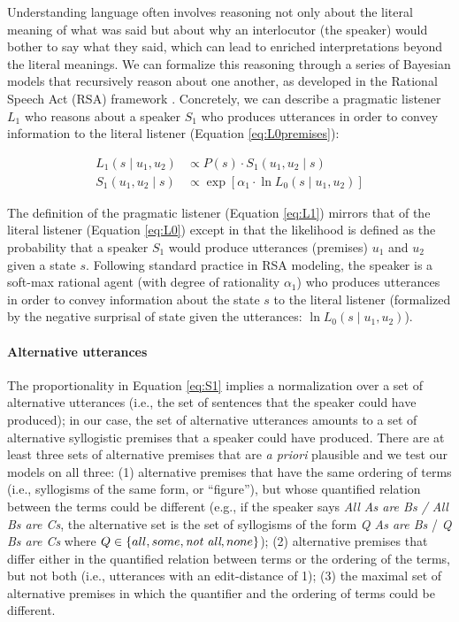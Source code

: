 \documentclass[floatsintext, doc]{apa6}
\begin{document}
Understanding language often involves reasoning not only about the literal meaning of what was said but about why an interlocutor (the speaker) would bother to say what they said, which can lead to enriched interpretations beyond the literal meanings. 
We can formalize this reasoning through a series of Bayesian models that recursively reason about one another, as developed in the Rational Speech Act (RSA) framework \cite{Frank2012a, goodman2016pragmatic, scontras2018probabilistic}.
Concretely, we can describe a pragmatic listener $L_1$ who reasons about a speaker $S_1$ who produces utterances in order to convey information to the literal listener (Equation \ref{eq:L0premises}):

\begin{align}
L_1(s \mid u_1,  u_2)& \propto  P(s)\cdot S_1(u_1, u_2 \mid s)  \label{eq:L1} \\ 
S_1(u_1, u_2 \mid s) &\propto  \exp [ \alpha_1 \cdot \ln L_0(s \mid u_1,  u_2)]  \label{eq:S1}
\end{align}

The definition of the pragmatic listener (Equation \ref{eq:L1}) mirrors that of the literal listener (Equation \ref{eq:L0}) except in that the likelihood is defined as the probability that a speaker $S_1$ would produce utterances (premises) $u_1$ and $u_2$ given a state $s$.
Following standard practice in RSA modeling, the speaker is a soft-max rational agent (with degree of rationality $\alpha_1$) who produces utterances in order to convey information about the state $s$ to the literal listener (formalized by the negative surprisal of state given the utterances: $\ln L_0(s \mid u_1,  u_2)$).

\paragraph{Alternative utterances}
The proportionality in Equation \ref{eq:S1} implies a normalization over a set of alternative utterances (i.e., the set of sentences that the speaker could have produced); in our case, the set of alternative utterances amounts to a set of alternative syllogistic premises that a speaker could have produced. 
There are at least three sets of alternative premises that are \emph{a priori} plausible and we test our models on all three: (1) alternative premises that have the same ordering of terms (i.e., syllogisms of the same form, or ``figure''), but whose quantified relation between the terms could be different (e.g., if the speaker says \emph{All As are Bs / All Bs are Cs}, the alternative set is the set of syllogisms of the form \emph{Q As are Bs} / \emph{Q Bs are Cs} where $Q \in \{all, some, \emph{not all}, none\}$); (2) alternative premises that differ either in the quantified relation between terms or the ordering of the terms, but not both (i.e., utterances with an edit-distance of 1); (3) the maximal set of alternative premises in which the quantifier and the ordering of terms could be different.
\end{document}

